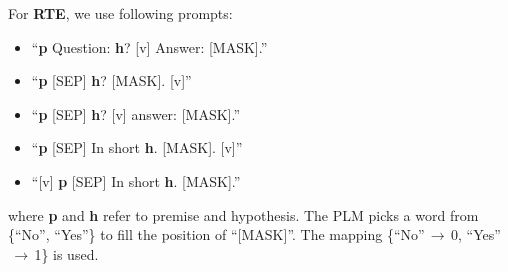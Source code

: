 For \textbf{RTE}, we use following prompts:
\begin{itemize}
\item ``\textbf{p} Question: \textbf{h}? [v] Answer: [MASK].''
\item ``\textbf{p} [SEP] \textbf{h}? [MASK]. [v]''
\item ``\textbf{p} [SEP] \textbf{h}? [v] answer: [MASK].''
\item ``\textbf{p} [SEP] In short \textbf{h}. [MASK]. [v]''
\item ``[v] \textbf{p} [SEP] In short \textbf{h}. [MASK].''
\end{itemize}
where \textbf{p} and \textbf{h}
refer to premise and hypothesis.
The PLM picks a word from
\{``No'', ``Yes''\}
to fill the position of ``[MASK]''.
The mapping
\{``No''$\,\to\,$0,
``Yes''$\,\to\,$1\}
is used.

